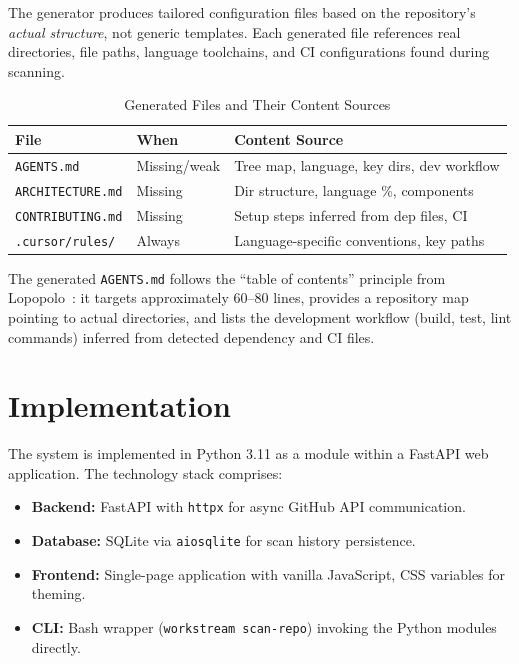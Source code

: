 \documentclass[11pt,twocolumn]{article}
\begin{document}
The generator produces tailored configuration files based on the
repository's \emph{actual structure}, not generic templates. Each
generated file references real directories, file paths, language
toolchains, and CI configurations found during scanning.

\begin{table}[H]
\centering
\caption{Generated Files and Their Content Sources}
\label{tab:genfiles}
\begin{tabular}{@{}llp{3.6cm}@{}}
\toprule
\textbf{File} & \textbf{When} & \textbf{Content Source} \\
\midrule
\texttt{AGENTS.md} & Missing/weak & Tree map, language, key dirs, dev workflow \\
\texttt{ARCHITECTURE.md} & Missing & Dir structure, language \%, components \\
\texttt{CONTRIBUTING.md} & Missing & Setup steps inferred from dep files, CI \\
\texttt{.cursor/rules/} & Always & Language-specific conventions, key paths \\
\bottomrule
\end{tabular}
\end{table}

\noindent The generated \texttt{AGENTS.md} follows the ``table of
contents'' principle from Lopopolo~\citep{lopopolo2026harness}: it
targets approximately 60--80 lines, provides a repository map pointing
to actual directories, and lists the development workflow (build, test,
lint commands) inferred from detected dependency and CI files.

\section{Implementation}
\label{sec:impl}

The system is implemented in Python 3.11 as a module within a FastAPI
web application. The technology stack comprises:

\begin{itemize}[leftmargin=1.5em]
    \item \textbf{Backend:} FastAPI with \texttt{httpx} for async
          GitHub API communication.
    \item \textbf{Database:} SQLite via \texttt{aiosqlite} for scan
          history persistence.
    \item \textbf{Frontend:} Single-page application with vanilla
          JavaScript, CSS variables for theming.
    \item \textbf{CLI:} Bash wrapper (\texttt{workstream scan-repo})
          invoking the Python modules directly.
\end{itemize}
\end{document}
